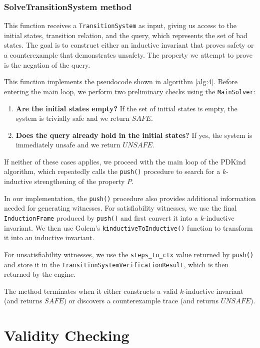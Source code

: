 \subsubsection{SolveTransitionSystem method}

\noindent This function receives a \texttt{TransitionSystem} as input, giving
us access to the initial states, transition relation, and the query, which
represents the set of bad states. The goal is to construct either an inductive
invariant that proves safety or a counterexample that demonstrates unsafety.
The property we attempt to prove is the negation of the query.

This function implements the pseudocode shown in algorithm \ref{alg:4}. Before entering the main loop, we perform two preliminary checks using the \texttt{MainSolver}:
\begin{enumerate}
    \item \textbf{Are the initial states empty?} If the set of initial states is empty, the system is trivially safe and we return \( SAFE \).
    \item \textbf{Does the query already hold in the initial states?} If yes, the system is immediately unsafe and we return \( UNSAFE \).
\end{enumerate}

If neither of these cases applies, we proceed with the main loop of the PDKind
algorithm, which repeatedly calls the \texttt{push()} procedure to search for a
\( k \)-inductive strengthening of the property \( P \).

In our implementation, the \texttt{push()} procedure also provides additional
information needed for generating witnesses. For satisfiability witnesses, we
use the final \texttt{InductionFrame} produced by \texttt{push()} and first
convert it into a \( k \)-inductive invariant. We then use Golem's
\texttt{kinductiveToInductive()} function to transform it into an inductive
invariant.

For unsatisfiability witnesses, we use the \texttt{steps\_to\_ctx} value
returned by \texttt{push()} and store it in the
\texttt{TransitionSystemVerificationResult}, which is then returned by the
engine.

The method terminates when it either constructs a valid \( k \)-inductive
invariant (and returns \( SAFE \)) or discovers a counterexample trace (and
returns \( UNSAFE \)).

\section{Validity Checking}

